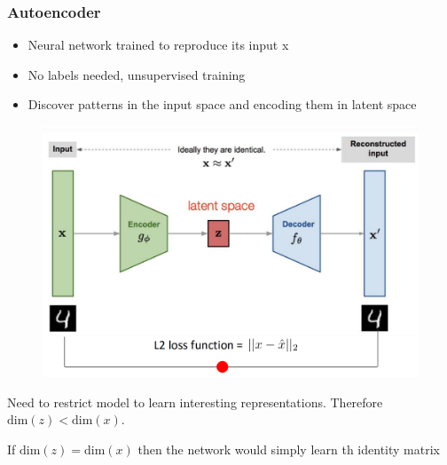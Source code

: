 \subsubsection{Autoencoder}
\begin{itemize}
    \item Neural network trained to reproduce its input x
    \item No labels needed, unsupervised training
    \item Discover patterns in the input space and encoding them in latent space
\end{itemize}
\begin{figure}[!h]
     \includegraphics[width = \columnwidth]{figures/GenAI2/Autoencoder.png}
\end{figure}

Need to restrict model to learn interesting representations.
Therefore \(\text{dim}(z) < \text{dim}(x)\).

If \(\text{dim}(z) = \text{dim}(x)\) then the network would simply learn th identity matrix
 

